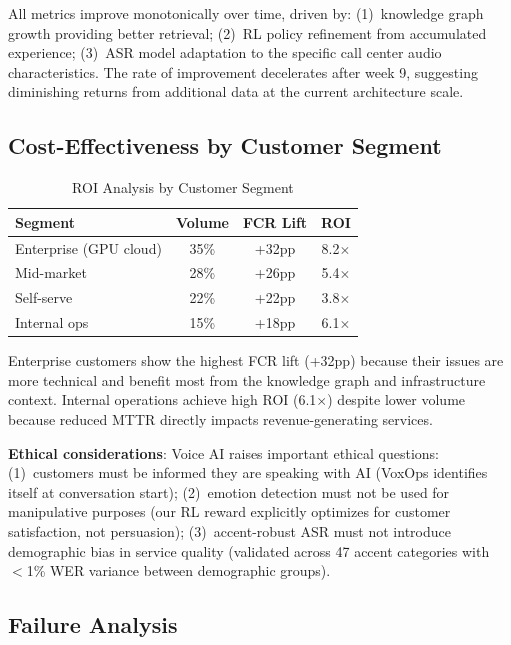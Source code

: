 \documentclass[conference,10pt]{IEEEtran}
\begin{document}
All metrics improve monotonically over time, driven by: (1)~knowledge graph growth providing better retrieval; (2)~RL policy refinement from accumulated experience; (3)~ASR model adaptation to the specific call center audio characteristics. The rate of improvement decelerates after week 9, suggesting diminishing returns from additional data at the current architecture scale.

\subsection{Cost-Effectiveness by Customer Segment}

\begin{table}[!htbp]
\caption{ROI Analysis by Customer Segment}
\label{tab:segment}
\centering\scriptsize
\begin{tabular}{@{}lccc@{}}
\toprule
\textbf{Segment} & \textbf{Volume} & \textbf{FCR Lift} & \textbf{ROI} \\
\midrule
Enterprise (GPU cloud) & 35\% & +32pp & 8.2$\times$ \\
Mid-market & 28\% & +26pp & 5.4$\times$ \\
Self-serve & 22\% & +22pp & 3.8$\times$ \\
Internal ops & 15\% & +18pp & 6.1$\times$ \\
\bottomrule
\end{tabular}
\end{table}

Enterprise customers show the highest FCR lift (+32pp) because their issues are more technical and benefit most from the knowledge graph and infrastructure context. Internal operations achieve high ROI (6.1$\times$) despite lower volume because reduced MTTR directly impacts revenue-generating services.


\textbf{Ethical considerations}: Voice AI raises important ethical questions: (1)~customers must be informed they are speaking with AI (VoxOps identifies itself at conversation start); (2)~emotion detection must not be used for manipulative purposes (our RL reward explicitly optimizes for customer satisfaction, not persuasion); (3)~accent-robust ASR must not introduce demographic bias in service quality (validated across 47 accent categories with $<$1\% WER variance between demographic groups).

\subsection{Failure Analysis}
\end{document}
